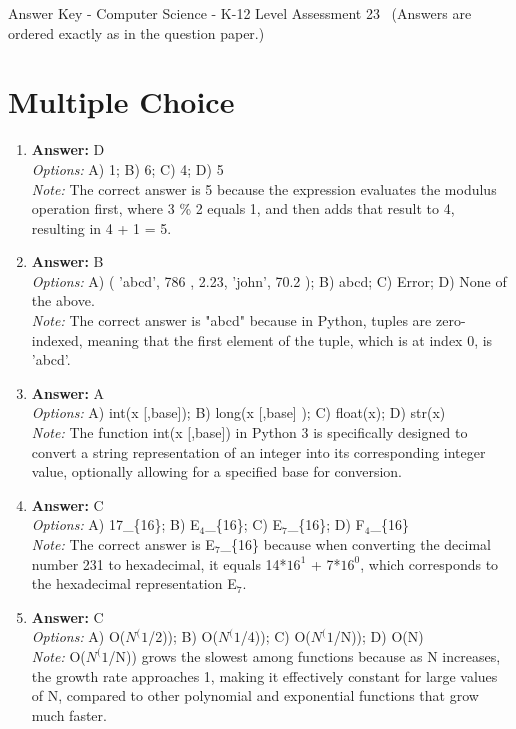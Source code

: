 \documentclass[12pt]{article}
\begin{document}
\begin{center}
Answer Key - Computer Science - K-12 Level Assessment 23 \
\small (Answers are ordered exactly as in the question paper.)
\end{center}

\section*{Multiple Choice}
\begin{enumerate}[label=\arabic*.]
\item \textbf{Answer:} D
\\ \textit{Options:} A) 1; B) 6; C) 4; D) 5
\\ \textit{Note:} The correct answer is 5 because the expression evaluates the modulus operation first, where 3 \% 2 equals 1, and then adds that result to 4, resulting in 4 + 1 = 5.
\item \textbf{Answer:} B
\\ \textit{Options:} A) ( 'abcd', 786 , 2.23, 'john', 70.2 ); B) abcd; C) Error; D) None of the above.
\\ \textit{Note:} The correct answer is "abcd" because in Python, tuples are zero-indexed, meaning that the first element of the tuple, which is at index 0, is 'abcd'.
\item \textbf{Answer:} A
\\ \textit{Options:} A) int(x [,base]); B) long(x [,base] ); C) float(x); D) str(x)
\\ \textit{Note:} The function int(x [,base]) in Python 3 is specifically designed to convert a string representation of an integer into its corresponding integer value, optionally allowing for a specified base for conversion.
\item \textbf{Answer:} C
\\ \textit{Options:} A) 17\_\{16\}; B) E$_{4}$\_\{16\}; C) E$_{7}$\_\{16\}; D) F$_{4}$\_\{16\}
\\ \textit{Note:} The correct answer is E$_{7}$\_\{16\} because when converting the decimal number 231 to hexadecimal, it equals 14*$16^1$ + 7*$16^0$, which corresponds to the hexadecimal representation E$_{7}$.
\item \textbf{Answer:} C
\\ \textit{Options:} A) O($N^(1$/2)); B) O($N^(1$/4)); C) O($N^(1$/N)); D) O(N)
\\ \textit{Note:} O($N^(1$/N)) grows the slowest among functions because as N increases, the growth rate approaches 1, making it effectively constant for large values of N, compared to other polynomial and exponential functions that grow much faster.
\end{enumerate}
\end{document}
